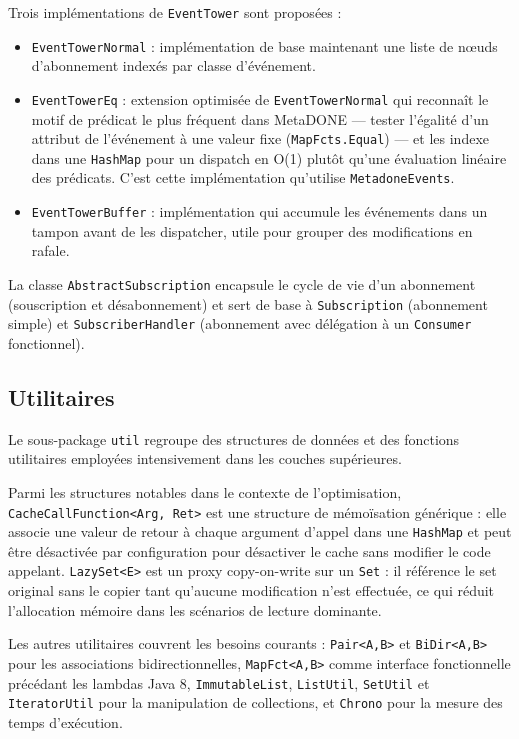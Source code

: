 Trois implémentations de \texttt{EventTower} sont proposées :
\begin{itemize}
    \item \texttt{EventTowerNormal} : implémentation de base maintenant
    une liste de nœuds d'abonnement indexés par classe d'événement.
    \item \texttt{EventTowerEq} : extension optimisée de
    \texttt{EventTowerNormal} qui reconnaît le motif de prédicat
    le plus fréquent dans MetaDONE --- tester l'égalité d'un attribut
    de l'événement à une valeur fixe (\texttt{MapFcts.Equal}) --- et
    les indexe dans une \texttt{HashMap} pour un dispatch en O(1) plutôt
    qu'une évaluation linéaire des prédicats. C'est cette implémentation
    qu'utilise \texttt{MetadoneEvents}.
    \item \texttt{EventTowerBuffer} : implémentation qui accumule les
    événements dans un tampon avant de les dispatcher, utile pour
    grouper des modifications en rafale.
\end{itemize}

La classe \texttt{AbstractSubscription} encapsule le cycle de vie d'un
abonnement (souscription et désabonnement) et sert de base à
\texttt{Subscription} (abonnement simple) et
\texttt{SubscriberHandler} (abonnement avec délégation à un
\texttt{Consumer} fonctionnel).

\subsection{Utilitaires}

Le sous-package \texttt{util} regroupe des structures de données et des
fonctions utilitaires employées intensivement dans les couches
supérieures.

Parmi les structures notables dans le contexte de l'optimisation,
\texttt{CacheCallFunction<Arg, Ret>} est une structure de mémoïsation
générique : elle associe une valeur de retour à chaque argument
d'appel dans une \texttt{HashMap} et peut être désactivée par
configuration pour désactiver le cache sans modifier le code appelant.
\texttt{LazySet<E>} est un proxy copy-on-write sur un \texttt{Set} : il
référence le set original sans le copier tant qu'aucune modification
n'est effectuée, ce qui réduit l'allocation mémoire dans les scénarios
de lecture dominante.

Les autres utilitaires couvrent les besoins courants : \texttt{Pair<A,B>}
et \texttt{BiDir<A,B>} pour les associations bidirectionnelles,
\texttt{MapFct<A,B>} comme interface fonctionnelle précédant les lambdas
Java 8, \texttt{ImmutableList}, \texttt{ListUtil}, \texttt{SetUtil} et
\texttt{IteratorUtil} pour la manipulation de collections, et
\texttt{Chrono} pour la mesure des temps d'exécution.

